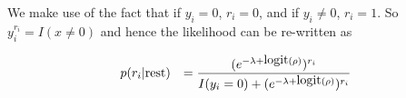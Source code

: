 \documentclass[11pt]{amsart}
\begin{document}
We make use of the fact that if $y_i = 0$, $r_i = 0$, and if $y_i \ne 0$,
$r_i = 1$. So $y_i^{r_i} = I(x \ne 0)$ and hence the likelihood can be re-written as

$$
\begin{array}{ll}
	p(r_i | \text{rest}) & \displaystyle = \frac{(e^{-\lambda + \mbox{logit}{(\rho)}})^{r_i}}{I(y_i = 0) + (e^{-\lambda + \mbox{logit}{(\rho)}})^{r_i}} 
\end{array}
$$
\end{document}
